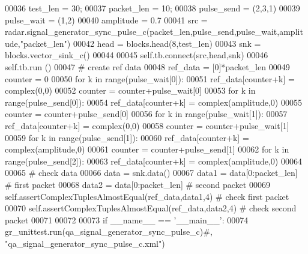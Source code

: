 \begin{DoxyCode}
00036         test\_len = 30;
00037         packet\_len = 10;
00038         pulse\_send = (2,3,1)
00039         pulse\_wait = (1,2)
00040         amplitude = 0.7
00041         src = radar.signal\_generator\_sync\_pulse\_c(packet\_len,pulse\_send,pulse\_wait,amplitude,\textcolor{stringliteral}{"packet\_len"})
00042         head = blocks.head(8,test\_len)
00043         snk = blocks.vector\_sink\_c()
00044         
00045         self.tb.connect(src,head,snk)
00046         self.tb.run ()
00047         \textcolor{comment}{# create ref data}
00048         ref\_data = [0]*packet\_len
00049         counter = 0
00050         \textcolor{keywordflow}{for} k \textcolor{keywordflow}{in} range(pulse\_wait[0]):
00051             ref\_data[counter+k] = complex(0,0)
00052         counter = counter+pulse\_wait[0]
00053         \textcolor{keywordflow}{for} k \textcolor{keywordflow}{in} range(pulse\_send[0]):
00054             ref\_data[counter+k] = complex(amplitude,0)
00055         counter = counter+pulse\_send[0]
00056         \textcolor{keywordflow}{for} k \textcolor{keywordflow}{in} range(pulse\_wait[1]):
00057             ref\_data[counter+k] = complex(0,0)
00058         counter = counter+pulse\_wait[1]
00059         \textcolor{keywordflow}{for} k \textcolor{keywordflow}{in} range(pulse\_send[1]):
00060             ref\_data[counter+k] = complex(amplitude,0)
00061         counter = counter+pulse\_send[1]
00062         \textcolor{keywordflow}{for} k \textcolor{keywordflow}{in} range(pulse\_send[2]):
00063             ref\_data[counter+k] = complex(amplitude,0)
00064         
00065         \textcolor{comment}{# check data}
00066         data = snk.data()
00067         data1 = data[0:packet\_len] \textcolor{comment}{# first packet}
00068         data2 = data[0:packet\_len] \textcolor{comment}{# second packet}
00069         self.assertComplexTuplesAlmostEqual(ref\_data,data1,4) \textcolor{comment}{# check first packet}
00070         self.assertComplexTuplesAlmostEqual(ref\_data,data2,4) \textcolor{comment}{# check second packet}
00071 
00072 
00073 \textcolor{keywordflow}{if} \_\_name\_\_ == \textcolor{stringliteral}{'\_\_main\_\_'}:
00074     gr\_unittest.run(qa\_signal\_generator\_sync\_pulse\_c)\textcolor{comment}{#, "qa\_signal\_generator\_sync\_pulse\_c.xml")}
\end{DoxyCode}
